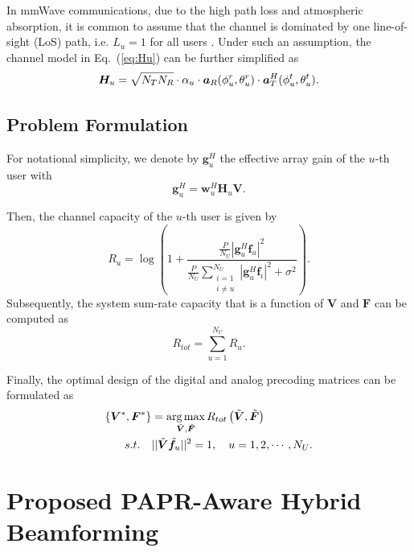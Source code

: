 \documentclass[conference]{IEEEtran}
\def\argmax{\mathop{\mbox{arg\,max}}}
\begin{document}
In mmWave communications, due to the high path loss and atmospheric absorption, it is common to assume that the channel is dominated by one line-of-sight (LoS) path, i.e. $L_u=1$ for all users \cite{alkhateeb2014channel}. Under such an assumption, the channel model in Eq.~(\ref{eq:Hu}) can be further simplified as
\begin{equation}{\label{eq:HuLu1}}
\bm{H}_u = \sqrt{N_{T}N_{R}}\cdot\alpha_u \cdot\bm{a}_{R}(\phi^r_{u},\theta^r_{u})\cdot\bm{a}^{H}_{T}(\phi^t_{u},\theta^t_{u}).
\end{equation}

\subsection{Problem Formulation}
For notational simplicity, we denote by ${\bm{g}}_{u}^H$ the effective array gain of the $u$-th user with
\begin{equation}\label{eq:defgu}
{\bm{g}}_{u}^H = \bm{w}^H_u \bm{H}_u \bm{V}.
\end{equation}

Then, the channel capacity of the $u$-th user is given by
\begin{equation}\label{eq:6}
R_u = \log\left(1+\frac{\frac{P}{N_U}|{\bm{g}}_{u}^H \bm{f}_u|^2}{\frac{P}{N_U}\displaystyle\sum_{\substack{i=1 \\ i\neq u}}^{N_U}|{\bm{g}}_{u}^H\bm{f}_i|^2+\sigma^2}\right).
\end{equation}
Subsequently, the system sum-rate capacity that is a function of ${\bm V}$ and ${\bm F}$ can be computed as
\begin{equation}
R_{tot}=\sum_{u=1}^{N_U}R_u.
\end{equation}

Finally, the optimal design of the digital and analog precoding matrices can be formulated as
\begin{align}\label{eq:maxsumrate}
\left\{{\bm V}^*,{\bm F}^*\right\} &= \argmax_{\tilde{\bm V},\tilde{\bm F}} R_{tot}\left(\tilde{\bm V},\tilde{\bm F}\right)\\ \nonumber
s.t. \quad&||\tilde{\bm V}\tilde{\bm f}_u||^2 = 1, \quad u=1,2,\cdots,N_U.
\end{align}

\section{Proposed PAPR-Aware Hybrid Beamforming}
\end{document}
